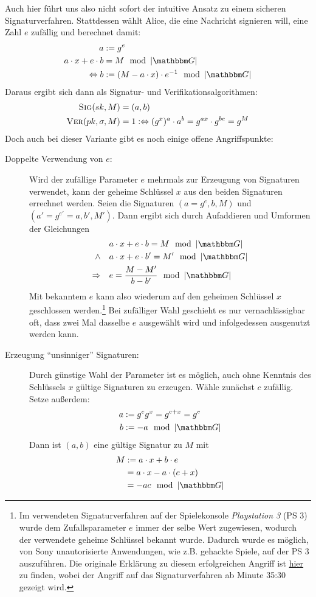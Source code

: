 Auch hier führt uns also nicht sofort der intuitive Ansatz zu einem sicheren Signaturverfahren. Stattdessen wählt Alice, die eine Nachricht
signieren will, eine Zahl $e$ zufällig und berechnet damit:
\begin{align*}
a &:= g^e\\
a \cdot x + e \cdot b &= M \mod \left|\G\right|\\
\Leftrightarrow b &:= (M - a \cdot x) \cdot e^{-1} \mod \left|\G\right|
\end{align*}
Daraus ergibt sich dann als Signatur- und Verifikationsalgorithmen:
\begin{align*}
\textsc{Sig}(sk,M) &= (a, b)\\
\textsc{Ver}(pk,\sigma,M) &= 1 :\Leftrightarrow (g^x)^a \cdot a^b = g^{ax} \cdot g^{be} = g^M
\end{align*}
Doch auch bei dieser Variante gibt es noch einige offene Angriffspunkte:
\begin{description}
	\item[Doppelte Verwendung von $e$:]
	Wird der zufällige Parameter $e$ mehrmals zur Erzeugung von Signaturen verwendet, kann der geheime Schlüssel $x$ aus den beiden Signaturen
	errechnet werden. Seien die Signaturen $(a = g^e, b, M)$ und $(a' = g^{e'} = a, b', M')$. Dann ergibt sich durch Aufaddieren und Umformen
	der Gleichungen
	\begin{align*}
	&a \cdot x + e \cdot b = M \mod \left|\G\right|\\
	\land \quad &a \cdot x + e \cdot b' = M' \mod \left|\G\right|\\
	\Rightarrow \quad &e = \frac{M - M'}{b - b'} \mod \left|\G\right|
	\end{align*}
	Mit bekanntem $e$ kann also wiederum auf den geheimen Schlüssel $x$ geschlossen werden.\footnote{Im verwendeten Signaturverfahren auf der Spielekonsole \textit{Playstation 3} (PS 3) wurde dem Zufallsparameter $e$ immer der selbe Wert zugewiesen, wodurch der verwendete geheime Schlüssel bekannt wurde. Dadurch wurde es möglich, von Sony unautorisierte Anwendungen, wie z.B. gehackte Spiele, auf der PS 3 auszuführen. Die originale Erklärung zu diesem erfolgreichen Angriff ist \href{https://www.youtube.com/watch?v=4loZGYqaZ7I}{hier} zu finden, wobei der Angriff auf das Signaturverfahren ab Minute 35:30 gezeigt wird.} Bei zufälliger Wahl geschieht es nur vernachlässigbar oft, dass zwei Mal dasselbe $e$ ausgewählt wird und infolgedessen ausgenutzt werden kann.
	\item[Erzeugung "`unsinniger"' Signaturen:]
	Durch günstige Wahl der Parameter ist es möglich, auch ohne Kenntnis des Schlüssels $x$ gültige Signaturen zu erzeugen. Wähle zunächst $c$
	zufällig. Setze außerdem:
	\begin{align*}
	a &:= g^cg^x = g^{c+x} = g^e\\
	b &:= -a \mod \left|\G\right|
	\end{align*}
	Dann ist $(a, b)$ eine gültige Signatur zu $M$ mit
	\begin{align*}
	M &:= a \cdot x + b \cdot e\\
	&= a \cdot x - a \cdot (c + x)\\
	&= -ac \mod \left|\G\right|
	\end{align*}
\end{description}

